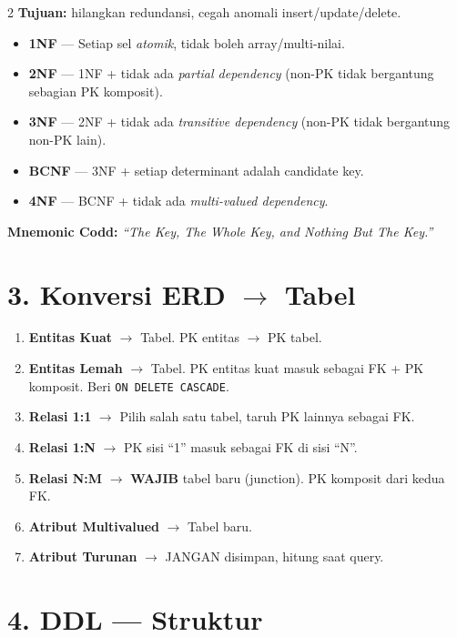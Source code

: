 \documentclass[10pt,a4paper]{article}
\begin{document}
\begin{multicols*}{2}
	\textbf{Tujuan:} hilangkan redundansi, cegah anomali insert/update/delete.

	\begin{itemize}
		\item \textbf{1NF} — Setiap sel \textit{atomik}, tidak boleh array/multi-nilai.
		\item \textbf{2NF} — 1NF + tidak ada \textit{partial dependency} (non-PK tidak bergantung sebagian PK komposit).
		\item \textbf{3NF} — 2NF + tidak ada \textit{transitive dependency} (non-PK tidak bergantung non-PK lain).
		\item \textbf{BCNF} — 3NF + setiap determinant adalah candidate key.
		\item \textbf{4NF} — BCNF + tidak ada \textit{multi-valued dependency}.
	\end{itemize}

	\textbf{Mnemonic Codd:} \textit{``The Key, The Whole Key, and Nothing But The Key.''}

	\section*{3. Konversi ERD $\to$ Tabel}

	\begin{enumerate}
		\item \textbf{Entitas Kuat} $\to$ Tabel. PK entitas $\to$ PK tabel.
		\item \textbf{Entitas Lemah} $\to$ Tabel. PK entitas kuat masuk sebagai FK + PK komposit. Beri \texttt{ON DELETE CASCADE}.
		\item \textbf{Relasi 1:1} $\to$ Pilih salah satu tabel, taruh PK lainnya sebagai FK.
		\item \textbf{Relasi 1:N} $\to$ PK sisi ``1'' masuk sebagai FK di sisi ``N''.
		\item \textbf{Relasi N:M} $\to$ \textbf{WAJIB} tabel baru (junction). PK komposit dari kedua FK.
		\item \textbf{Atribut Multivalued} $\to$ Tabel baru.
		\item \textbf{Atribut Turunan} $\to$ JANGAN disimpan, hitung saat query.
	\end{enumerate}

	\section*{4. DDL — Struktur}


\end{multicols*}
\end{document}
